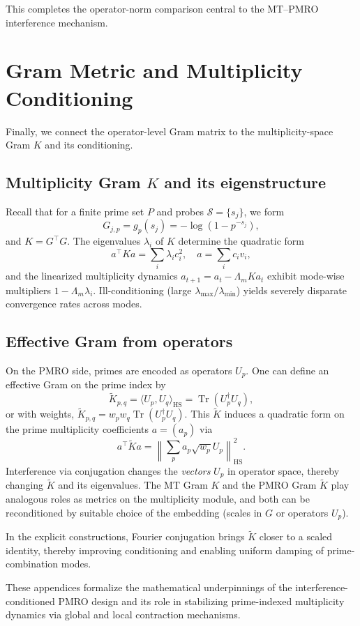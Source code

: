 \documentclass[11pt]{article}
\begin{document}
This completes the operator-norm comparison central to the MT--PMRO interference mechanism.

\section{Gram Metric and Multiplicity Conditioning}

Finally, we connect the operator-level Gram matrix to the multiplicity-space Gram $K$ and its conditioning.

\subsection{Multiplicity Gram $K$ and its eigenstructure}

Recall that for a finite prime set $P$ and probes $\mathcal{S}=\{s_j\}$, we form
\[
  G_{j,p} = g_p(s_j) = -\log(1-p^{-s_j}),
\]
and $K=G^\top G$. The eigenvalues $\lambda_i$ of $K$ determine the quadratic form
\[
  a^\top K a = \sum_i \lambda_i c_i^2,\quad a=\sum_i c_i v_i,
\]
and the linearized multiplicity dynamics $a_{t+1}=a_t-\Lambda_m K a_t$ exhibit mode-wise multipliers $1-\Lambda_m\lambda_i$. Ill-conditioning (large $\lambda_{\max}/\lambda_{\min}$) yields severely disparate convergence rates across modes.

\subsection{Effective Gram from operators}

On the PMRO side, primes are encoded as operators $U_p$. One can define an effective Gram on the prime index by
\[
  \tilde{K}_{p,q} = \langle U_p, U_q\rangle_{\mathrm{HS}} = \operatorname{Tr}(U_p^\dagger U_q),
\]
or with weights, $\tilde{K}_{p,q} = w_p w_q \operatorname{Tr}(U_p^\dagger U_q)$. This $\tilde{K}$ induces a quadratic form on the prime multiplicity coefficients $a=(a_p)$ via
\[
  a^\top \tilde{K} a = \left\|\sum_p a_p \sqrt{w_p} U_p\right\|_{\mathrm{HS}}^2.
\]
Interference via conjugation changes the \emph{vectors} $U_p$ in operator space, thereby changing $\tilde{K}$ and its eigenvalues. The MT Gram $K$ and the PMRO Gram $\tilde{K}$ play analogous roles as metrics on the multiplicity module, and both can be reconditioned by suitable choice of the embedding (scales in $G$ or operators $U_p$).

In the explicit constructions, Fourier conjugation brings $\tilde{K}$ closer to a scaled identity, thereby improving conditioning and enabling uniform damping of prime-combination modes.

\bigskip

\noindent
These appendices formalize the mathematical underpinnings of the interference-conditioned PMRO design and its role in stabilizing prime-indexed multiplicity dynamics via global and local contraction mechanisms.

\nocite{*}
  
  
\end{document}
